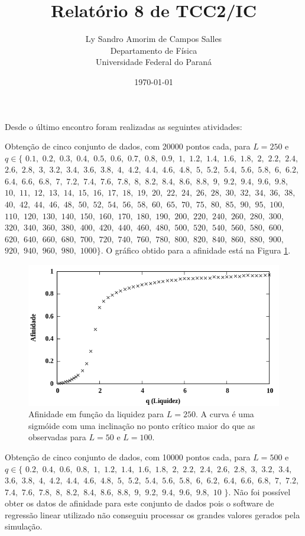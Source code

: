 \documentclass[12pt,a4paper,final]{article}
\title{Relatório 8 de TCC2/IC}
\author{Ly Sandro Amorim de Campos Salles\\Departamento de Física\\Universidade Federal do Paraná}
\date{\today}
\begin{document}
	\maketitle

  Desde o último encontro foram realizadas as seguintes atividades:

  Obtenção de cinco conjunto de dados, com 20000 pontos cada, para $L=250$ e $q\in\{$ 
  $0.1,$ $0.2,$ $0.3,$ $0.4,$ $0.5,$ $0.6,$ $0.7,$ $0.8,$ $0.9,$
  $1,$ $1.2,$ $1.4,$ $1.6,$ $1.8,$ 
  $2,$ $2.2,$ $2.4,$ $2.6,$ $2.8,$ 
  $3,$ $3.2,$ $3.4,$ $3.6,$ $3.8,$
  $4,$ $4.2,$ $4.4,$ $4.6,$ $4.8,$
  $5,$ $5.2,$ $5.4,$ $5.6,$ $5.8,$
  $6,$ $6.2,$ $6.4,$ $6.6,$ $6.8,$
  $7,$ $7.2,$ $7.4,$ $7.6,$ $7.8,$
  $8,$ $8.2,$ $8.4,$ $8.6,$ $8.8,$
  $9,$ $9.2,$ $9.4,$ $9.6,$ $9.8,$ $10,$
  $11,$ $12,$ $13,$ $14,$ $15,$ $16,$ $17,$ $18,$ $19,$ $20,$
  $22,$ $24,$ $26,$ $28,$ $30,$ $32,$ $34,$ $36,$ $38,$ $40,$
  $42,$ $44,$ $46,$ $48,$ $50,$ $52,$ $54,$ $56,$ $58,$ $60,$
  $65,$ $70,$ $75,$ $80,$ $85,$ $90,$ $95,$ $100,$ $110,$
  $120,$ $130,$ $140,$ $150,$ $160,$ $170,$ $180,$ $190,$
  $200,$ $220,$ $240,$ $260,$ $280,$ $300,$ $320,$ $340,$ $360,$ $380,$
  $400,$ $420,$ $440,$ $460,$ $480,$ $500,$ $520,$ $540,$ $560,$ $580,$
  $600,$ $620,$ $640,$ $660,$ $680,$ $700,$ $720,$ $740,$ $760,$ $780,$
  $800,$ $820,$ $840,$ $860,$ $880,$ $900,$ $920,$ $940,$ $960,$ $980,$
  $1000\}$. O gráfico obtido para a afinidade está na Figura \ref{fig:L250}.

  \begin{figure}[h]
    \centering
    \includegraphics[width=.7\linewidth]{L250.png}
    \caption{Afinidade em função da liquidez para $L = 250$. A curva é uma sigmóide com uma inclinação no ponto crítico maior do que as observadas para $L=50$ e $L=100$.}
    \label{fig:L250}
  \end{figure}
  

  Obtenção de cinco conjunto de dados, com 10000 pontos cada, para $L=500$ e $q\in\{$
  $0.2,$ $0.4,$ $0.6,$ $0.8,$ $1,$
  $1.2,$ $1.4,$ $1.6,$ $1.8,$	$2,$
  $2.2,$ $2.4,$ $2.6,$ $2.8,$ $3,$
  $3.2,$ $3.4,$ $3.6,$ $3.8,$ $4,$
  $4.2,$ $4.4,$ $4.6,$ $4.8,$ $5,$
  $5.2,$ $5.4,$ $5.6,$ $5.8,$ $6,$
  $6.2,$ $6.4,$ $6.6,$ $6.8,$ $7,$
  $7.2,$ $7.4,$ $7.6,$ $7.8,$ $8,$
  $8.2,$ $8.4,$ $8.6,$ $8.8,$ $9,$
  $9.2,$ $9.4,$ $9.6,$ $9.8,$ $10$
  $\}$. Não foi possível obter os datos de afinidade para este conjunto de dados pois o software de regressão linear utilizado não conseguiu processar os grandes valores gerados pela simulação. 
\end{document}
